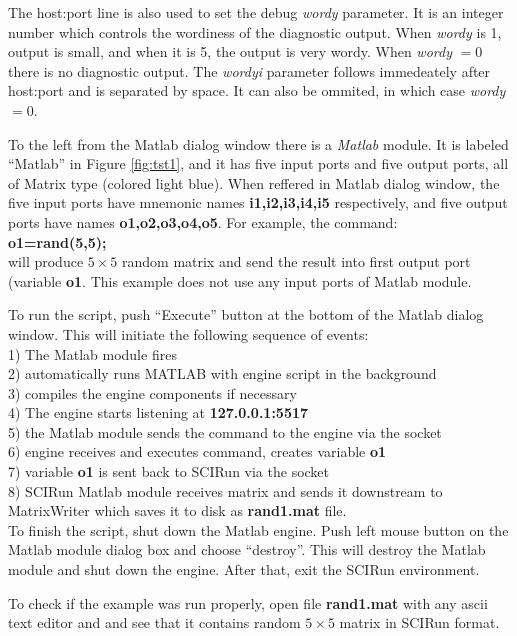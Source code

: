 \documentclass[12pt]{IEEEtran}
\begin{document}
The host:port line is also used to set the debug {\it wordy} parameter.
It is an integer number which controls the wordiness
of the diagnostic output. When {\it wordy} is 1, output is small, and
when it is 5, the output is very wordy. When {\it wordy} $=0$ there
is no diagnostic output. The {\it wordyi} parameter follows immedeately after
host:port and is separated by space. It can also be ommited, in which
case {\it wordy} $=0$.

To the left from the Matlab dialog window there is a {\it Matlab } module.
It is labeled ``Matlab'' in Figure \ref{fig:tst1}, and it has five input
ports and five output ports, all of Matrix type (colored light blue). 
When reffered in Matlab dialog window, the five input ports have mnemonic 
names {\bf i1,i2,i3,i4,i5} respectively, and five output ports have
names {\bf o1,o2,o3,o4,o5}. For example, the command: \\
{\bf o1=rand(5,5);} \\
will produce $5 \times 5$ random matrix and send the result
into first output port (variable {\bf o1}. This example does
not use any input ports of Matlab module.

To run the script, push ``Execute'' button at the bottom of the
Matlab dialog window. This will initiate the following
sequence of events: \\
1) The Matlab module fires \\
2) automatically runs MATLAB with engine script in the background  \\
3) compiles the engine components if necessary \\
4) The engine starts listening at {\bf 127.0.0.1:5517} \\
5) the Matlab module sends the command to the engine via the socket\\
6) engine receives and executes command, creates variable {\bf o1} \\
7) variable {\bf o1} is sent back to SCIRun via the socket \\
8) SCIRun Matlab module receives matrix and sends it downstream
   to MatrixWriter which saves it to disk as {\bf rand1.mat} file. \\

To finish the script, shut down the Matlab engine. 
Push left mouse button on the
Matlab module dialog box and choose ``destroy''. This will destroy
the Matlab module and shut down the engine. After that, exit
the SCIRun environment. 

To check if the example was run properly, open file {\bf rand1.mat }
with any ascii text editor and and see that it contains random
$5 \times 5$ matrix in SCIRun format. 
\end{document}
